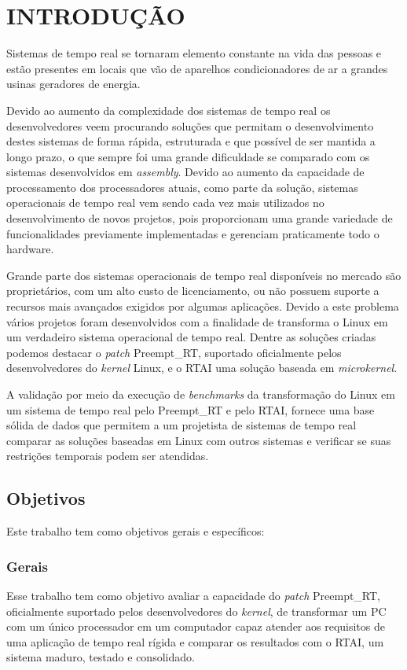 \chapter{INTRODUÇÃO}
\label{cap:introducao}
Sistemas de tempo real se tornaram elemento constante na vida das pessoas e estão presentes em locais que vão de aparelhos condicionadores de ar a grandes usinas geradores de energia.

Devido ao aumento da complexidade dos sistemas de tempo real os desenvolvedores veem procurando soluções que permitam o desenvolvimento destes sistemas de forma rápida, estruturada e que possível de ser mantida a longo prazo, o que sempre foi uma grande dificuldade se comparado com os sistemas desenvolvidos em \textit{assembly}. Devido ao aumento da capacidade de processamento dos processadores atuais, como parte da solução, sistemas operacionais de tempo real vem sendo cada vez mais utilizados no desenvolvimento de novos projetos, pois proporcionam uma grande variedade de funcionalidades previamente implementadas e gerenciam praticamente todo o hardware. 

Grande parte dos sistemas operacionais de tempo real disponíveis no mercado são proprietários, com um alto custo de licenciamento, ou não possuem suporte a recursos mais avançados exigidos por algumas aplicações. Devido a este problema vários projetos foram desenvolvidos com a finalidade de transforma o Linux em um verdadeiro sistema operacional de tempo real. Dentre as soluções criadas podemos destacar o \textit{patch} Preempt\_RT, suportado oficialmente pelos desenvolvedores do \textit{kernel} Linux, e o RTAI uma solução baseada em \textit{microkernel}.

A validação por meio da execução de \textit{benchmarks} da transformação do Linux em um sistema de tempo real pelo Preempt\_RT e pelo RTAI, fornece uma base sólida de dados que permitem a um projetista de sistemas de tempo real comparar as soluções baseadas em Linux com outros sistemas e verificar se suas restrições temporais podem ser atendidas.

\section{Objetivos}
Este trabalho tem como objetivos gerais e específicos:
\subsection{Gerais}
Esse trabalho tem como objetivo avaliar a capacidade do \textit{patch} Preempt\_RT, oficialmente
suportado pelos desenvolvedores do \textit{kernel}, de transformar um PC com um único processador em um
computador capaz atender aos requisitos de uma aplicação de tempo real rígida e comparar os
resultados com o RTAI, um sistema maduro, testado e consolidado.

